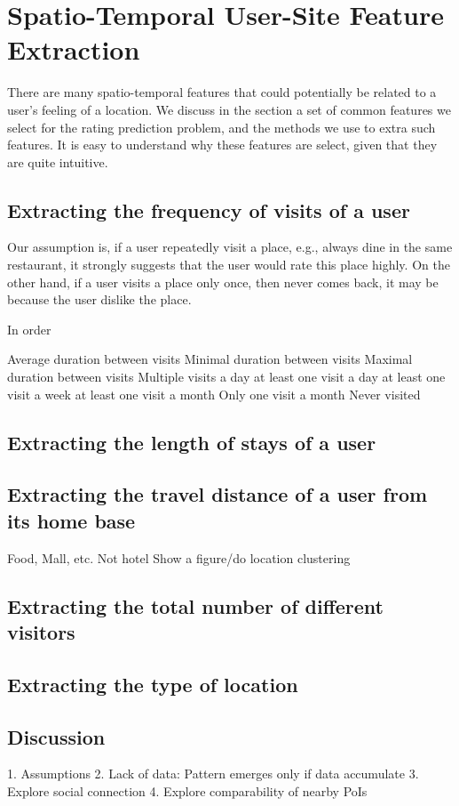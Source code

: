 \section{Spatio-Temporal User-Site Feature Extraction}
\label{sec:method}

There are many spatio-temporal features that could potentially be related to a user's feeling of a location. We discuss in the section a set of common features we select for the rating prediction problem, and the methods we use to extra such features. It is easy to understand why these features are select, given that they are quite intuitive.

\subsection{Extracting the frequency of visits of a user}

Our assumption is, if a user repeatedly visit a place, e.g., always dine in the same restaurant, it strongly suggests that the user would rate this place highly. On the other hand, if a user visits a place only once, then never comes back, it may be because the user dislike the place.

In order 

Average duration between visits
Minimal duration between visits
Maximal duration between visits
Multiple visits a day
at least one visit a day
at least one visit a week
at least one visit a month
Only one visit a month
Never visited

\subsection{Extracting the length of stays of a user}


\subsection{Extracting the travel distance of a user from its home base}

Food, Mall, etc. Not hotel
Show a figure/do location clustering


\subsection{Extracting the total number of different visitors}


\subsection{Extracting the type of location}


\subsection{Discussion}
1. Assumptions
2. Lack of data: Pattern emerges only if data accumulate
3. Explore social connection
4. Explore comparability of nearby PoIs
